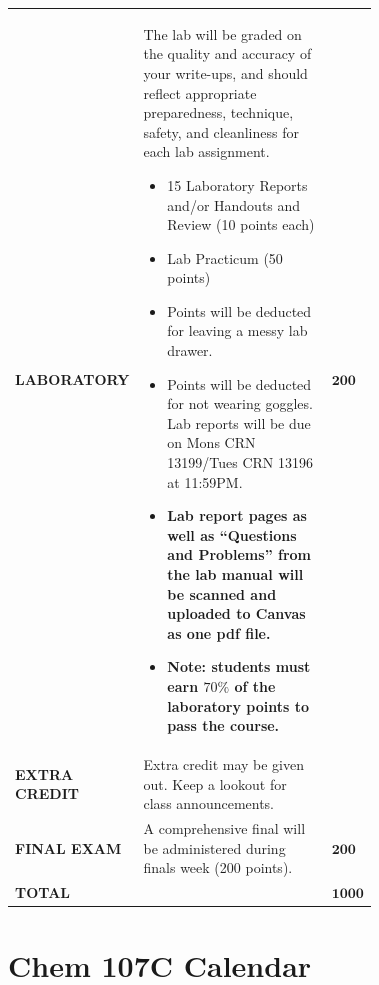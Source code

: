 \documentclass[11pt]{article}
\begin{document}
\begin{table}[H]
\begin{tabular}{|l|p{0.72\linewidth}|l|}
  \textbf{LABORATORY} & The lab will be graded on the quality and accuracy
    of your write-ups, and should reflect appropriate preparedness, technique, safety, and
    cleanliness for each lab assignment.
    \begin{itemize}
    \setlength\itemsep{0em}
    \item 15 Laboratory Reports and/or Handouts and Review
      (10 points each)
    \item Lab Practicum (50 points)
    \item Points will be deducted for leaving a messy lab drawer.
    \item Points will be deducted for not wearing goggles. Lab reports will be due
      on Mons CRN 13199/Tues CRN 13196  at 11:59PM.
    \item \textbf{Lab report pages as well as “Questions and Problems” from the lab
      manual will be scanned and uploaded to Canvas as one pdf file.}
    \item \textbf{Note: students must earn $70\%$ of the laboratory points to pass
      the course.}
    \end{itemize}
  & $\mathbf{200}$ \\

  \textbf{EXTRA CREDIT} & Extra credit may be given out. Keep a lookout for class announcements. & \\
    
  \textbf{FINAL EXAM} & A comprehensive final will be administered during finals week (200 points).
  & $\mathbf{200}$ \\

  \textbf{TOTAL} &  & $\mathbf{1000}$ \\
  \hline
\end{tabular}
\end{table}

\section{Chem 107C Calendar}
\end{document}
